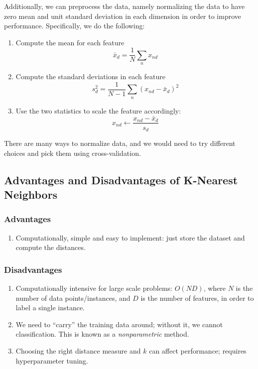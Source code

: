 \documentclass[11 pt]{scrartcl}
\begin{document}
Additionally, we can preprocess the data, namely normalizing the data to have zero mean and unit standard deviation in each dimension in order to improve performance. Specifically, we do the following:
\begin{enumerate}
  \item Compute the mean for each feature
    $$
    \bar{x}_d = \frac{1}{N} \sum_n x_{nd}
    $$
  \item Compute the standard deviations in each feature
    $$
    s_d^2 = \frac{1}{N - 1} \sum_n (x_{nd} - \bar{x}_d)^2
    $$
  \item Use the two statistics to scale the feature accordingly:
    $$
    x_{nd} \leftarrow \frac{x_{nd} - \bar{x}_d}{s_d}
    $$
\end{enumerate}
There are many ways to normalize data, and we would need to try different choices and pick them using cross-validation.
\subsection{Advantages and Disadvantages of K-Nearest Neighbors}
\subsubsection{Advantages}
\begin{enumerate}
  \item Computationally, simple and easy to implement: just store the dataset and compute the distances.
\end{enumerate}
\subsubsection{Disadvantages}
\begin{enumerate}
  \item Computationally intensive for large scale problems: $O(ND)$, where $N$ is the number of data points/instances, and $D$ is the number of features, in order to label a single instance.
  \item We need to ``carry'' the training data around; without it, we cannot classification. This is known as a \textit{nonparametric} method.
  \item Choosing the right distance measure and $k$ can affect performance; requires hyperparameter tuning.
\end{enumerate}
\end{document}
